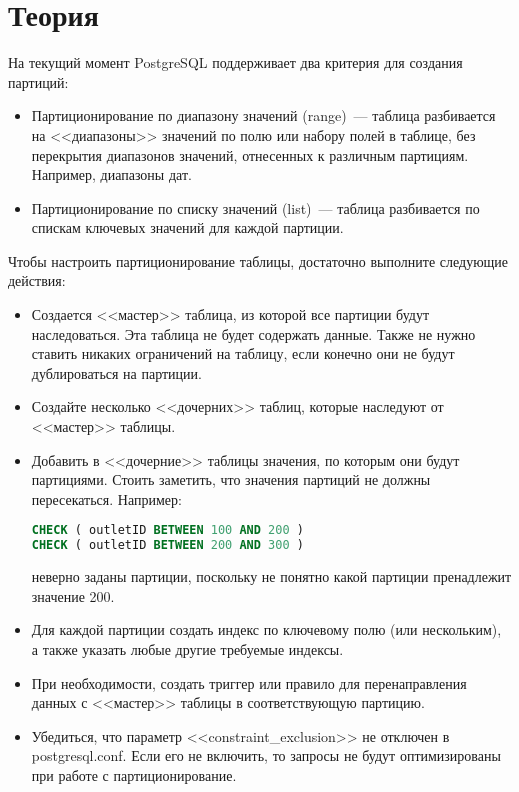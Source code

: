 \section{Теория}
На текущий момент PostgreSQL поддерживает два критерия для создания партиций:
\begin{itemize}
\item Партиционирование по диапазону значений (range)~--- таблица разбивается на <<диапазоны>> значений по полю или набору полей 
в таблице, без перекрытия диапазонов значений, отнесенных к различным партициям. Например, диапазоны дат.
\item Партиционирование по списку значений (list)~--- таблица разбивается по спискам ключевых значений для каждой партиции.
\end{itemize}

Чтобы настроить партиционирование таблицы, достаточно выполните следующие действия:
\begin{itemize}
\item Создается <<мастер>> таблица, из которой все партиции будут наследоваться. Эта таблица не будет содержать данные. 
Также не нужно ставить никаких ограничений на таблицу, если конечно они не будут дублироваться на партиции.
\item Создайте несколько <<дочерних>> таблиц, которые наследуют от <<мастер>> таблицы. 
\item Добавить в <<дочерние>> таблицы значения, по которым они будут партициями. 
Стоить заметить, что значения партиций не должны пересекаться. Например:
\begin{lstlisting}[language=SQL,label=lst:partitioning1,caption=Пример неверного задлания значений партиций]
CHECK ( outletID BETWEEN 100 AND 200 )
CHECK ( outletID BETWEEN 200 AND 300 )
\end{lstlisting}
неверно заданы партиции, поскольку не понятно какой партиции пренадлежит значение 200. 
\item Для каждой партиции создать индекс по ключевому полю (или нескольким), а также указать любые другие требуемые индексы.
\item При необходимости, создать триггер или правило для перенаправления данных с <<мастер>> таблицы в соответствующую партицию.
\item Убедиться, что параметр <<constraint\_exclusion>> не отключен в postgresql.conf. Если его не включить, то запросы не будут 
оптимизированы при работе с партиционирование.
\end{itemize}

